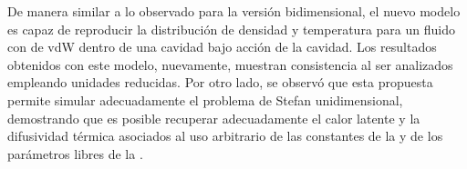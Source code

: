 De manera similar a lo observado para la versi\'on bidimensional, el nuevo modelo es capaz de reproducir la distribuci\'on de densidad y temperatura para un fluido con \eos{} de vdW dentro de una cavidad bajo acci\'on de la cavidad. Los resultados obtenidos con este modelo, nuevamente, muestran consistencia al ser analizados empleando unidades reducidas. Por otro lado, se observ\'o que esta propuesta permite simular adecuadamente el problema de Stefan unidimensional, demostrando que es posible recuperar adecuadamente el calor latente y la difusividad t\'ermica asociados al uso arbitrario de las constantes de la \eos{} y de los par\'ametros libres de la \edf{}.